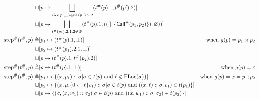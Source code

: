 \documentclass{article}
\begin{document}
\begin{align*}
  \sqcup                          & [p\mapsto\bigsqcup_{\langle\lambda x.p',\_\rangle\in{t}^{\#}(p_1).2.2}({t}^{\#}(p).1,{t}^{\#}(p').2)]                                                                                                                    \\
  \sqcup                          & [p\mapsto\bigsqcup_{{t}^{\#}(p_1).2.1.2\neq\varnothing}({t}^{\#}(p).1,(([],\{{\textsf{Call}}^{\#}(p_1,p_2)\}),\varnothing))]                                                                                                      \\
  {\text{step}}^{\#}({t}^{\#},p) \triangleq & [p_1\mapsto({t}^{\#}(p).1,\bot)]                                                                                                    & \text{when }g(p)={p_1}\rtimes{p_2}                                                 \\
  \sqcup                          & [p_2\mapsto({t}^{\#}(p_1).2.1,\bot)]                                                                                                                                                                                   \\
  \sqcup                          & [p\mapsto({t}^{\#}(p).1,{t}^{\#}(p_2).2)]                                                                                                                                                                               \\
  {\text{step}}^{\#}({t}^{\#},p) \triangleq & [p\mapsto({t}^{\#}(p).1,\bot)]                                                                                                      & \text{when }g(p)=\varepsilon                                                     \\
  {\text{step}}^{\#}({t}^{\#},p) \triangleq & [p_1\mapsto\{(x,p_1)::\sigma|\sigma\in t(p)\text{ and }\ell\not\in\text{FLoc}(\sigma)\}]                                                    & \text{when }g(p)=x=p_1;p_2                                                       \\
  \sqcup                          & [p_2\mapsto\{(x,\mu.\{0\leftarrow{\ell}\}{v_1})::\sigma|\sigma\in t(p)\text{ and }((x,\ell)::\sigma,v_1)\in t(p_1)\}]                                                                                                       \\
  \sqcup                          & [p\mapsto\{(\sigma,(x,w_1)::\sigma_2)|\sigma\in t(p)\text{ and }((x,w_1)::\sigma,\sigma_2)\in t(p_2)\}]
\end{align*}
\end{document}
